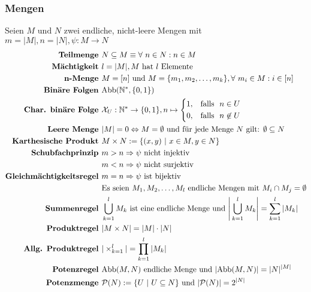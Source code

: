\documentclass{article}
\begin{document}
		\subsubsection*{Mengen}
				Seien $M \text{ und } N$ zwei endliche, nicht-leere Mengen mit $m = |M|, n = |N|, \psi: M \rightarrow N$\\
				\begin{align*}
					\textbf{Teilmenge } & N \subseteq M \equiv \forall\ n \in N: n \in M\\
					\textbf{M\"achtigkeit } & l = |M|, M \text{ hat } l \text{ Elemente}\\
					\textbf{n-Menge } & M = [n] \text{ und } M = \{m_1, m_2, \ldots, m_k\}, \forall\ m_i \in M: i \in [n]\\
					\textbf{Bin\"are Folgen } & \text{Abb}(\mathbb{N}^*, \{0, 1\})\\
					\textbf{Char. bin\"are Folge } & \mathcal{X}_U: \mathbb{N}^* \rightarrow \{0, 1\}, n \mapsto \begin{cases*}1, & \text{falls } $n \in U$\\0, & \text{falls } $n \not\in U$\end{cases*}\\
					\textbf{Leere Menge } & |M| = 0 \Leftrightarrow M = \emptyset \text{ und f\"ur jede Menge } N \text{ gilt: } \emptyset \subseteq N\\
					\textbf{Karthesische Produkt } & M \times N := \{(x, y)\ |\ x \in M, y \in N\}\\
					\textbf{Schubfachprinzip } & m > n \Rightarrow \psi \text{ nicht injektiv}\\
					& m < n \Rightarrow \psi \text{ nicht surjektiv}\\
					\textbf{Gleichm\"achtigkeitsregel } & m = n \Rightarrow \psi \text{ ist bijektiv}\\
					& \text{Es seien } M_1, M_2, \ldots, M_l \text{ endliche Mengen mit } M_i \cap M_j = \emptyset\\
					\textbf{Summenregel } & \bigcup_{k=1}^{l}M_k \text{ ist eine endliche Menge und } \Bigg|\bigcup_{k=1}^{l}M_k\Bigg| = \sum_{k=1}^{l} |M_k|\\
					\textbf{Produktregel } & |M \times N| = |M| \cdot |N| \\
					\textbf{Allg. Produktregel } & |\times_{k=1}^{l}| = \prod_{k=1}^{l}|M_k|\\
					\textbf{Potenzregel } & \text{Abb}(M, N) \text{ endliche Menge und } |\text{Abb}(M, N)| = |N|^{|M|}\\
					\textbf{Potenzmenge } & \mathcal{P}(N) := \{U\ |\ U \subseteq N\} \text{ und } |\mathcal{P}(N)| = 2^{|N|}\\

\end{align*}
\end{document}

